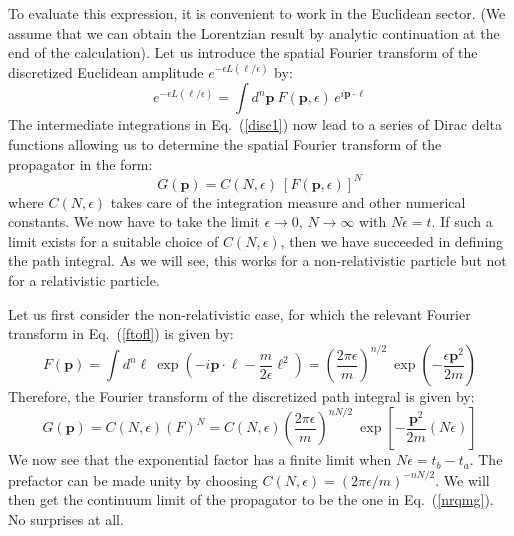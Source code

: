 \documentclass{article}
\def\eq#1{{Eq.~(\ref{#1})}}
\def\frab#1#2{\left(\frac{#1}{#2}\right)}
\begin{document}
To evaluate this expression, it is convenient to work in the Euclidean sector. (We assume that we can obtain the Lorentzian result by analytic continuation at the end of the calculation). Let us introduce the spatial Fourier transform of the discretized Euclidean amplitude $e^{-\epsilon L(\bm{\ell}/\epsilon)}$ by:
\begin{equation}
 e^{-\epsilon L(\bm{\ell}/\epsilon)} = \int d^n \bm{p}\ F(\bm{p},\epsilon)\, e^{i{\bm{p\cdot \ell}}}
 \label{ftofl}
\end{equation}
The intermediate integrations in \eq{disc1} now lead to a series of Dirac delta functions allowing us to determine the spatial Fourier transform of the propagator in the form:
\begin{equation}
 G(\bm{p}) = C(N,\epsilon)\ \left[ F(\bm{p},\epsilon)\right]^{N}
 \label{gengofp}
\end{equation} 
where $C(N,\epsilon)$ takes care of the integration measure and other numerical constants.
  We now have to take the limit $\epsilon\to 0$, $N\to \infty$ with $N\epsilon =t$. If such a limit exists for a suitable choice of $C(N,\epsilon)$, then we have succeeded in defining the path integral. As we will see, this works for a non-relativistic particle but not for a relativistic particle.

 Let us first consider the non-relativistic case, for which the relevant Fourier transform in \eq{ftofl} is given by:
\begin{equation}
 F(\bm{p})= \int d^n\bm{\ell}\ \exp\left(-i\bm{p\cdot \ell} - \frac{m}{2\epsilon} \bm{\ell}^2\right) = \frab{2\pi \epsilon}{m}^{n/2} \ \exp\left(-\frac{\epsilon \bm{p}^2}{2m}\right)
 \label{fofpnr}
\end{equation} 
Therefore, the Fourier transform of the discretized path integral is given by:
\begin{equation}
  G(\bm{p}) =C(N,\epsilon) (F)^{N} = C(N,\epsilon)\frab{2\pi \epsilon}{m}^{nN/2} \ \exp\left[-\frac{\bm{p}^2}{2m} (N \epsilon)\right]
\end{equation} 
We now see that the exponential factor has a finite limit when $N \epsilon = t_b-t_a$. The prefactor can be made unity by choosing $C(N,\epsilon)=(2\pi \epsilon/m)^{-nN/2} $. We will then get the continuum limit of the propagator to be the one in \eq{nrqmg}. No surprises at all.
\end{document}
